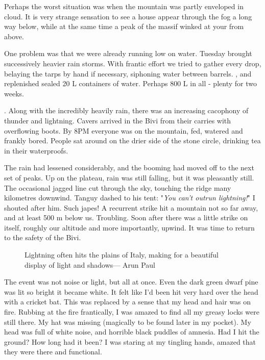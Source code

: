 Perhaps the worst situation was when the mountain was partly enveloped in cloud. It is very strange sensation to see a house appear through the fog a long way below, while at the same time a peak of the  massif winked at your from above. 

One problem was that we were already running low on water. Tuesday brought successively heavier rain storms. With frantic effort we tried to gather every drop, belaying the tarps by hand if necessary, siphoning water between barrels. , and replenished sealed 20 L containers of water. Perhaps 800 L in all - plenty for two weeks. 

. Along with the incredibly heavily rain, there was an increasing cacophony of thunder and lightning. Cavers arrived in the Bivi from their carries with overflowing boots. By 8PM everyone was on the mountain, fed, watered and frankly bored. People sat around on the drier side of the stone circle, drinking tea in their waterproofs. 

The rain had lessened considerably, and the booming had moved off to the next set of peaks. Up on the plateau, rain was still falling, but it was pleasantly still. The occasional jagged line cut through the sky, touching the ridge many kilometres downwind. Tanguy dashed to his tent: "\emph{You can't outrun lightning!}" I shouted after him. Such japes! A recurrent strike hit a mountain not so far away, and at least 500 m below us. Troubling. Soon after there was a little strike on  itself, roughly our altitude and more importantly, upwind. It was time to return to the safety of the Bivi.

\begin{figure*}[t!]
\checkoddpage \ifoddpage \forcerectofloat \else \forceversofloat \fi
\centering
{}
\caption{Lightning often hits the plains of Italy, making for a beautiful display of light and shadows--- Arun Paul}
\label{lightning}
\end{figure*}


The event was not noise or light, but all at once.  Even the dark green dwarf pine was lit so bright it became white. It felt like I'd been hit very hard over the head with a cricket bat. This was replaced by a sense that my head and hair was on fire. Rubbing at the fire frantically, I was amazed to find all my greasy locks were still there. My hat was missing (magically to be found later in my pocket). My head was full of white noise, and horrible black puddles of amnesia. Had I hit the ground? How long had it been? I was staring at my tingling hands, amazed that they were there and functional. 

